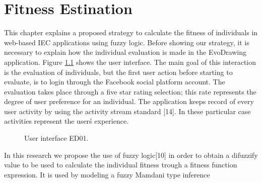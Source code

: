 \chapter{Fitness Estination}

This chapter explains a proposed strategy to calculate the fitness of
individuals in web-based IEC applications
using fuzzy logic. Before showing our strategy, it is necessary to explain how
the individual evaluation is made in the EvoDrawing application. Figure
\ref{fig:UI_ED} shows the user interface.
The main goal of this interaction is the evaluation of individuals, but
the first user action before starting to evaluate, is to login through the
Facebook \cite{facebook} social
platform account. The evaluation takes place through a
five star rating selection; this rate represents the degree of user
preference for an individual. The application keeps record of every user
activity by using the activity stream standard [14]. %
In these particular case activities represent the user\'s experience.

\begin{figure}
\captionsetup{justification=centering,margin=2cm}
\centering
\setlength\fboxsep{0pt}
\setlength\fboxrule{0.7pt}
\caption{User interface ED01.}
\label{fig:UI_ED}
\end{figure}

In this research we propose the use of fuzzy logic[10] in order to obtain a %
difuzzify value to be used to calculate the individual fitness trough a fitness
function expression. It is used by modeling a fuzzy Mamdani type inference

